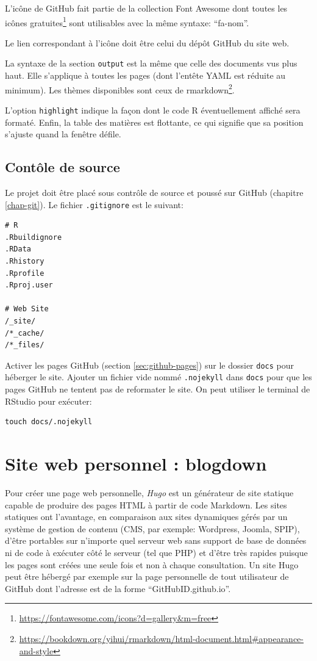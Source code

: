 \documentclass[
  12pt,
  french,
  a4paper,
  extrafontsizes,onecolumn,openright
  ]{memoir}
\begin{document}
L'icône de GitHub fait partie de la collection Font Awesome dont toutes les icônes gratuites\footnote{\url{https://fontawesome.com/icons?d=gallery&m=free}} sont utilisables avec la même syntaxe: \enquote{fa-nom}.

Le lien correspondant à l'icône doit être celui du dépôt GitHub du site web.

La syntaxe de la section \texttt{output} est la même que celle des documents vus plus haut.
Elle s'applique à toutes les pages (dont l'entête YAML est réduite au minimum).
Les thèmes disponibles sont ceux de rmarkdown\footnote{\url{https://bookdown.org/yihui/rmarkdown/html-document.html\#appearance-and-style}}.

L'option \texttt{highlight} indique la façon dont le code R éventuellement affiché sera formaté.
Enfin, la table des matières est flottante, ce qui signifie que sa position s'ajuste quand la fenêtre défile.

\subsection{Contôle de source}\label{contuxf4le-de-source}

Le projet doit être placé sous contrôle de source et poussé sur GitHub (chapitre \ref{chap-git}).
Le fichier \texttt{.gitignore} est le suivant:

\begin{verbatim}
# R
.Rbuildignore
.RData
.Rhistory
.Rprofile
.Rproj.user

# Web Site
/_site/
/*_cache/
/*_files/
\end{verbatim}

Activer les pages GitHub (section \ref{sec:github-pages}) sur le dossier \texttt{docs} pour héberger le site.
Ajouter un fichier vide nommé \texttt{.nojekyll} dans \texttt{docs} pour que les pages GitHub ne tentent pas de reformater le site.
On peut utiliser le terminal de RStudio pour exécuter:

\begin{verbatim}
touch docs/.nojekyll
\end{verbatim}

\section{Site web personnel : blogdown}\label{sec:blogdown}

Pour créer une page web personnelle, \emph{Hugo} est un générateur de site statique capable de produire des pages HTML à partir de code Markdown.
Les sites statiques ont l'avantage, en comparaison aux sites dynamiques gérés par un système de gestion de contenu (CMS, par exemple: Wordpress, Joomla, SPIP), d'être portables sur n'importe quel serveur web sans support de base de données ni de code à exécuter côté le serveur (tel que PHP) et d'être très rapides puisque les pages sont créées une seule fois et non à chaque consultation.
Un site Hugo peut être hébergé par exemple sur la page personnelle de tout utilisateur de GitHub dont l'adresse est de la forme \enquote{GitHubID.github.io}.
\end{document}
